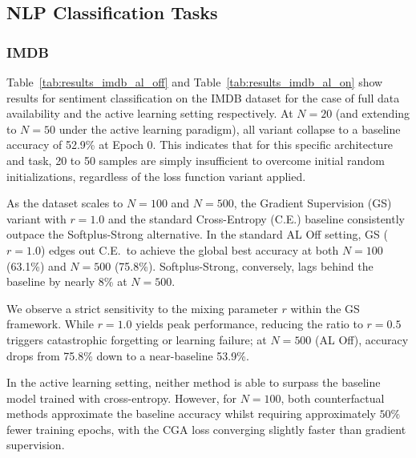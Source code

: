 %
%

\subsection{NLP Classification Tasks}

\subsubsection{IMDB}
Table~\ref{tab:results_imdb_al_off} and Table~\ref{tab:results_imdb_al_on} show results for sentiment classification on the IMDB dataset for the case of full data availability and the active learning setting respectively. At $N=20$ (and extending to $N=50$ under the active learning paradigm), all variant collapse to a baseline accuracy of 52.9\% at Epoch 0. This indicates that for this specific architecture and task, 20 to 50 samples are simply insufficient to overcome initial random initializations, regardless of the loss function variant applied.

As the dataset scales to $N=100$ and $N=500$, the Gradient Supervision (GS) variant with $r=1.0$ and the standard Cross-Entropy (C.E.) baseline consistently outpace the Softplus-Strong alternative. In the standard AL Off setting, GS ($r=1.0$) edges out C.E.\ to achieve the global best accuracy at both $N=100$ (63.1\%) and $N=500$ (75.8\%). Softplus-Strong, conversely, lags behind the baseline by nearly 8\% at $N=500$.

We observe a strict sensitivity to the mixing parameter $r$ within the GS framework. While $r=1.0$ yields peak performance, reducing the ratio to $r=0.5$ triggers catastrophic forgetting or learning failure; at $N=500$ (AL Off), accuracy drops from 75.8\% down to a near-baseline 53.9\%. 

In the active learning setting, neither method is able to surpass the baseline model trained with cross-entropy. However, for $N=100$, both counterfactual methods approximate the baseline accuracy whilst requiring approximately $50\%$ fewer training epochs, with the CGA loss converging slightly faster than gradient supervision.

